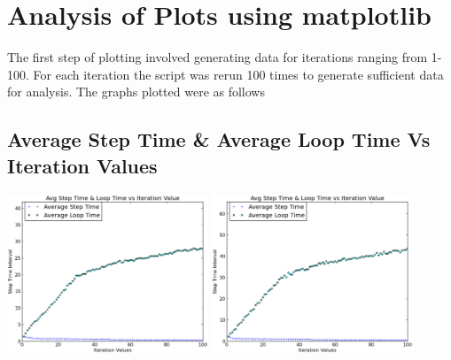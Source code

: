 \documentclass[11pt, a4paper]{article}
\begin{document}
\section{Analysis of Plots using matplotlib \cite{plot}}

The first step of plotting involved generating data for iterations ranging from 1-100. For each iteration the script was rerun 100 times to generate sufficient data for analysis. The graphs plotted were as follows \\ 

\subsection{Average Step Time \& Average Loop Time Vs Iteration Values}
\begin{center}
\includegraphics[width = 6cm]{plots-normal/l1.eps}
\includegraphics[width = 6cm]{plots-high/h1.eps}
\end{center}
\end{document}
